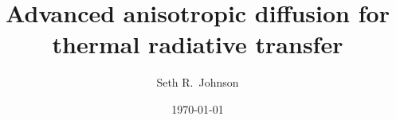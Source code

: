 \author{Seth R.~Johnson}
\title{Advanced anisotropic diffusion for thermal radiative transfer}
\date{\today}

\usepackage{color}

\newcommand{\chapter}[1]{%
\par\vspace{2ex}%
\noindent%
\hspace{\stretch{1}}%
\colorbox{intertextbg}{\parbox{0.75\columnwidth}{Chapter from Seth's
dissertation: \emph{#1}}}%
\hspace{\stretch{1}}%
\vspace{2ex}\par%
}

\graphicspath{{/Users/seth/_research/figures/}}
\makeatletter
{}
\makeatother

\newcommand{\prelistpar}{}

\usepackage{booktabs} %
\usepackage{rotating}
